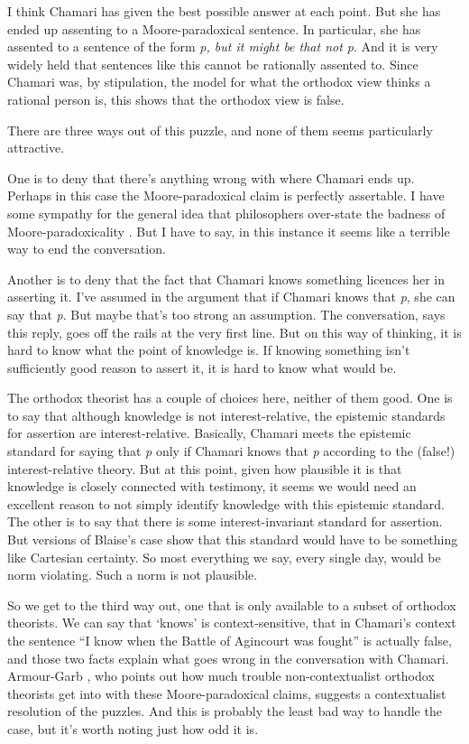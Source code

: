 \documentclass[
  11pt,
]{book}
\begin{document}
I think Chamari has given the best possible answer at each point. But she has ended up assenting to a Moore-paradoxical sentence. In particular, she has assented to a sentence of the form \emph{p, but it might be that not p}. And it is very widely held that sentences like this cannot be rationally assented to. Since Chamari was, by stipulation, the model for what the orthodox view thinks a rational person is, this shows that the orthodox view is false.

There are three ways out of this puzzle, and none of them seems particularly attractive.

One is to deny that there's anything wrong with where Chamari ends up. Perhaps in this case the Moore-paradoxical claim is perfectly assertable. I have some sympathy for the general idea that philosophers over-state the badness of Moore-paradoxicality \citep{MaitraWeatherson2010}. But I have to say, in this instance it seems like a terrible way to end the conversation.

Another is to deny that the fact that Chamari knows something licences her in asserting it. I've assumed in the argument that if Chamari knows that \emph{p}, she can say that \emph{p}. But maybe that's too strong an assumption. The conversation, says this reply, goes off the rails at the very first line. But on this way of thinking, it is hard to know what the point of knowledge is. If knowing something isn't sufficiently good reason to assert it, it is hard to know what would be.

The orthodox theorist has a couple of choices here, neither of them good. One is to say that although knowledge is not interest-relative, the epistemic standards for assertion are interest-relative. Basically, Chamari meets the epistemic standard for saying that \emph{p} only if Chamari knows that \emph{p} according to the (false!) interest-relative theory. But at this point, given how plausible it is that knowledge is closely connected with testimony, it seems we would need an excellent reason to not simply identify knowledge with this epistemic standard. The other is to say that there is some interest-invariant standard for assertion. But versions of Blaise's case show that this standard would have to be something like Cartesian certainty. So most everything we say, every single day, would be norm violating. Such a norm is not plausible.

So we get to the third way out, one that is only available to a subset of orthodox theorists. We can say that `knows' is context-sensitive, that in Chamari's context the sentence ``I know when the Battle of Agincourt was fought'' is actually false, and those two facts explain what goes wrong in the conversation with Chamari. Armour-Garb \citeyearpar{ArmourGarb2011}, who points out how much trouble non-contextualist orthodox theorists get into with these Moore-paradoxical claims, suggests a contextualist resolution of the puzzles. And this is probably the least bad way to handle the case, but it's worth noting just how odd it is.
\end{document}
